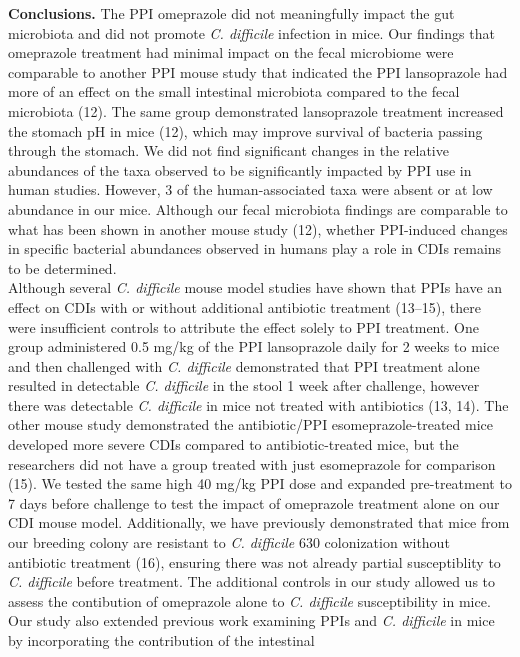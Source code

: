 \documentclass[11pt,]{article}
\begin{document}
\textbf{Conclusions.} The PPI omeprazole did not meaningfully impact the
gut microbiota and did not promote \emph{C. difficile} infection in
mice. Our findings that omeprazole treatment had minimal impact on the
fecal microbiome were comparable to another PPI mouse study that
indicated the PPI lansoprazole had more of an effect on the small
intestinal microbiota compared to the fecal microbiota (12). The same
group demonstrated lansoprazole treatment increased the stomach pH in
mice (12), which may improve survival of bacteria passing through the
stomach. We did not find significant changes in the relative abundances
of the taxa observed to be significantly impacted by PPI use in human
studies. However, 3 of the human-associated taxa were absent or at low
abundance in our mice. Although our fecal microbiota findings are
comparable to what has been shown in another mouse study (12), whether
PPI-induced changes in specific bacterial abundances observed in humans
play a role in CDIs remains to be determined.\\
Although several \emph{C. difficile} mouse model studies have shown that
PPIs have an effect on CDIs with or without additional antibiotic
treatment (13--15), there were insufficient controls to attribute the
effect solely to PPI treatment. One group administered 0.5 mg/kg of the
PPI lansoprazole daily for 2 weeks to mice and then challenged with
\emph{C. difficile} demonstrated that PPI treatment alone resulted in
detectable \emph{C. difficile} in the stool 1 week after challenge,
however there was detectable \emph{C. difficile} in mice not treated
with antibiotics (13, 14). The other mouse study demonstrated the
antibiotic/PPI esomeprazole-treated mice developed more severe CDIs
compared to antibiotic-treated mice, but the researchers did not have a
group treated with just esomeprazole for comparison (15). We tested the
same high 40 mg/kg PPI dose and expanded pre-treatment to 7 days before
challenge to test the impact of omeprazole treatment alone on our CDI
mouse model. Additionally, we have previously demonstrated that mice
from our breeding colony are resistant to \emph{C. difficile} 630
colonization without antibiotic treatment (16), ensuring there was not
already partial susceptiblity to \emph{C. difficile} before treatment.
The additional controls in our study allowed us to assess the
contibution of omeprazole alone to \emph{C. difficile} susceptibility in
mice.\\
Our study also extended previous work examining PPIs and \emph{C.
difficile} in mice by incorporating the contribution of the intestinal
\end{document}
